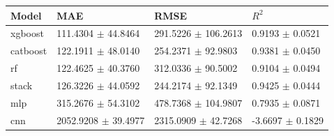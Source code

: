 \begin{tabular}{llll}
\toprule
Model & MAE & RMSE & $R^2$ \\
\midrule
xgboost & 111.4304 $\pm$ 44.8464 & 291.5226 $\pm$ 106.2613 & 0.9193 $\pm$ 0.0521 \\
catboost & 122.1911 $\pm$ 48.0140 & 254.2371 $\pm$ 92.9803 & 0.9381 $\pm$ 0.0450 \\
rf & 122.4625 $\pm$ 40.3760 & 312.0336 $\pm$ 90.5002 & 0.9104 $\pm$ 0.0494 \\
stack & 126.3226 $\pm$ 44.0592 & 244.2174 $\pm$ 92.1349 & 0.9425 $\pm$ 0.0444 \\
mlp & 315.2676 $\pm$ 54.3102 & 478.7368 $\pm$ 104.9807 & 0.7935 $\pm$ 0.0871 \\
cnn & 2052.9208 $\pm$ 39.4977 & 2315.0909 $\pm$ 42.7268 & -3.6697 $\pm$ 0.1829 \\
\bottomrule
\end{tabular}
